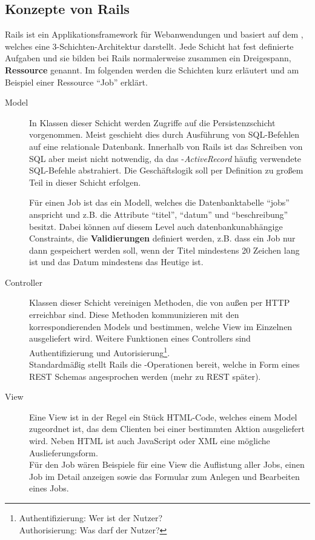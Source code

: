 \subsection{Konzepte von Rails}
\label{sec:railsconcepts}
Rails ist ein Applikationsframework für Webanwendungen und basiert auf dem  , welches eine 3-Schichten-Architektur darstellt. Jede Schicht hat fest definierte Aufgaben und sie bilden bei Rails normalerweise zusammen ein Dreigespann, \textbf{Ressource} genannt. Im folgenden werden die Schichten kurz erläutert und am Beispiel einer Ressource "`Job"' erklärt.
\begin{description}
 \item[Model] In Klassen dieser Schicht werden Zugriffe auf die Persistenzschicht vorgenommen. Meist geschieht dies durch Ausführung von SQL-Befehlen auf eine relationale Datenbank. Innerhalb von Rails ist das Schreiben von SQL aber meist nicht notwendig, da das -\textit{ActiveRecord} häufig verwendete SQL-Befehle abstrahiert. Die Geschäftslogik soll per Definition zu großem Teil in dieser Schicht erfolgen.

 Für einen Job ist das ein Modell, welches die Datenbanktabelle "`jobs"' anspricht und z.B. die Attribute "`titel"', "`datum"' und "`beschreibung"' besitzt. Dabei können auf diesem Level auch datenbankunabhängige Constraints, die \textbf{Validierungen} definiert werden, z.B. dass ein Job nur dann gespeichert werden soll, wenn der Titel mindestens 20 Zeichen lang ist und das Datum mindestens das Heutige ist.
 \item[Controller] Klassen dieser Schicht vereinigen Methoden, die von außen per HTTP erreichbar sind. Diese Methoden kommunizieren mit den korrespondierenden Models und bestimmen, welche View im Einzelnen ausgeliefert wird. Weitere Funktionen eines Controllers sind Authentifizierung und Autorisierung\footnote{Authentifizierung: Wer ist der Nutzer?\\Authorisierung: Was darf der Nutzer?}.\\
 Standardmäßig stellt Rails die -Operationen bereit, welche in Form eines REST Schemas angesprochen werden (mehr zu REST später).
 \item[View] Eine View ist in der Regel ein Stück HTML-Code, welches einem Model zugeordnet ist, das dem Clienten bei einer bestimmten Aktion ausgeliefert wird. Neben HTML ist auch JavaScript oder XML eine mögliche Auslieferungsform.\\
 Für den Job wären Beispiele für eine View die Auflistung aller Jobs, einen Job im Detail anzeigen sowie das Formular zum Anlegen und Bearbeiten eines Jobs.
\end{description}
